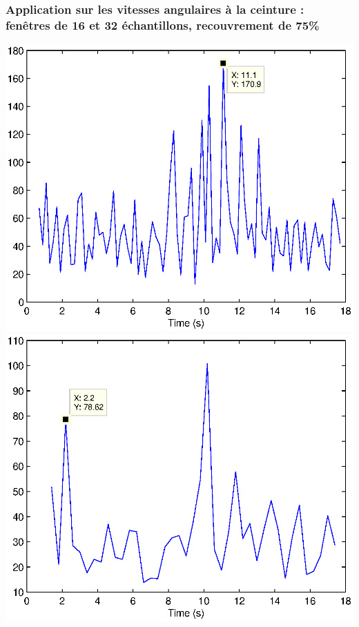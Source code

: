 \documentclass{beamer}
\begin{document}
\begin{frame}
\frametitle{Application sur les vitesses angulaires à la ceinture :\\fenêtres de 16 et 32 échantillons, recouvrement de 75\%}
\hspace*{-1.8cm}\includegraphics[scale=0.47]{examplewasser16gyr}\includegraphics[scale=0.47]{examplewasser32gyr}
\end{frame}
\end{document}
